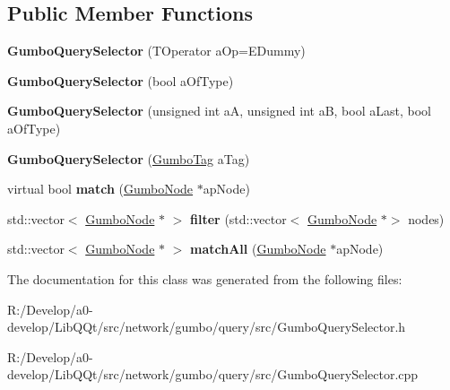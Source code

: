 \subsection*{Public Member Functions}
\begin{DoxyCompactItemize}
\item 
\mbox{\label{class_gumbo_query_selector_a12239dfc61e19e56e8e0f0f0ce27b4f3}} 
{\bfseries Gumbo\+Query\+Selector} (T\+Operator a\+Op=E\+Dummy)
\item 
\mbox{\label{class_gumbo_query_selector_a21071cc3976b4a0059da63be057f4a2e}} 
{\bfseries Gumbo\+Query\+Selector} (bool a\+Of\+Type)
\item 
\mbox{\label{class_gumbo_query_selector_ad971ab2f98739b00e750b9560072ad0d}} 
{\bfseries Gumbo\+Query\+Selector} (unsigned int aA, unsigned int aB, bool a\+Last, bool a\+Of\+Type)
\item 
\mbox{\label{class_gumbo_query_selector_a83ffb7b12d76408577c44cd46b994812}} 
{\bfseries Gumbo\+Query\+Selector} (\mbox{\hyperlink{gumbo_8h_a5a3aa6f4b039f85875d638088e676a0f}{Gumbo\+Tag}} a\+Tag)
\item 
\mbox{\label{class_gumbo_query_selector_a0e06308e0e797ba47d6d28f4dd527202}} 
virtual bool {\bfseries match} (\mbox{\hyperlink{gumbo_8h_a5f67d8397fda8fb7c90cc27f14ac4e7d}{Gumbo\+Node}} $\ast$ap\+Node)
\item 
\mbox{\label{class_gumbo_query_selector_af994ffebcaddb8480e397b3b281818a4}} 
std\+::vector$<$ \mbox{\hyperlink{gumbo_8h_a5f67d8397fda8fb7c90cc27f14ac4e7d}{Gumbo\+Node}} $\ast$ $>$ {\bfseries filter} (std\+::vector$<$ \mbox{\hyperlink{gumbo_8h_a5f67d8397fda8fb7c90cc27f14ac4e7d}{Gumbo\+Node}} $\ast$$>$ nodes)
\item 
\mbox{\label{class_gumbo_query_selector_a888da1bbb2710b8c56558e3da00f332e}} 
std\+::vector$<$ \mbox{\hyperlink{gumbo_8h_a5f67d8397fda8fb7c90cc27f14ac4e7d}{Gumbo\+Node}} $\ast$ $>$ {\bfseries match\+All} (\mbox{\hyperlink{gumbo_8h_a5f67d8397fda8fb7c90cc27f14ac4e7d}{Gumbo\+Node}} $\ast$ap\+Node)
\end{DoxyCompactItemize}


The documentation for this class was generated from the following files\+:\begin{DoxyCompactItemize}
\item 
R\+:/\+Develop/a0-\/develop/\+Lib\+Q\+Qt/src/network/gumbo/query/src/Gumbo\+Query\+Selector.\+h\item 
R\+:/\+Develop/a0-\/develop/\+Lib\+Q\+Qt/src/network/gumbo/query/src/Gumbo\+Query\+Selector.\+cpp\end{DoxyCompactItemize}
